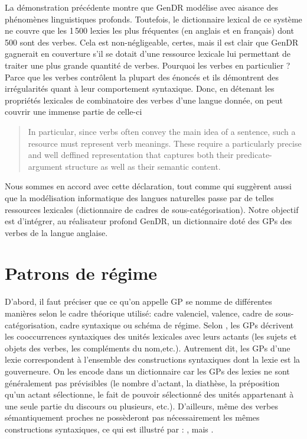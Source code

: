 
La démonstration précédente montre que GenDR modélise avec aisance des phénomènes linguistiques profonds. Toutefois, le dictionnaire lexical de ce système ne couvre que les 1\,500 lexies les plus fréquentes (en anglais et en français) dont 500 sont des verbes. Cela est non-négligeable, certes, mais il est clair que GenDR gagnerait en couverture s'il se dotait d'une ressource lexicale lui permettant de traiter une plus grande quantité de verbes. Pourquoi les verbes en particulier ? Parce que les verbes contrôlent la plupart des énoncés et ils démontrent des irrégularités quant à leur comportement syntaxique. Donc, en détenant les propriétés lexicales de combinatoire des verbes d'une langue donnée, on peut couvrir une immense partie de celle-ci

\begin{quote}
In particular, since verbs often convey the main idea of a sentence, such a resource must represent verb meanings. These require a particularly precise and well deffined representation that captures both their predicate-argument structure as well as their semantic content.
\end{quote}
\vspace{-\baselineskip}
\hfill
\cite{SchulerVerbnetBroadcoverageComprehensive2005}

Nous sommes en accord avec cette déclaration, tout comme \cite{Korhonenlargesubcategorizationlexicon2006} qui suggèrent aussi que la modélisation informatique des langues naturelles passe par de telles ressources lexicales (dictionnaire de cadres de sous-catégorisation).  Notre objectif est d'intégrer, au réalisateur profond GenDR, un dictionnaire doté des \acp{GP} des verbes de la langue anglaise.

\section{Patrons de régime}\label{sec:gp}

D'abord, il faut préciser que ce qu'on appelle \ac{GP} se nomme de différentes manières selon le cadre théorique utilisé: cadre valenciel, valence, cadre de sous-catégorisation, cadre syntaxique ou schéma de régime. Selon \cite{MilicevicSchemaregimepont2009}, les \acp{GP} décrivent les cooccurrences syntaxiques des unités lexicales avec leurs actants (les sujets et objets des verbes, les compléments du nom,etc.). Autrement dit, les \acp{GP} d'une lexie correspondent à l'ensemble des constructions syntaxiques dont la lexie est la gouverneure. On les encode dans un dictionnaire car les \acp{GP} des lexies ne sont généralement pas prévisibles (le nombre d'actant, la diathèse, la préposition qu'un actant sélectionne, le fait de pouvoir sélectionné des unités appartenant à une seule partie du discours ou plusieurs, etc.). D'ailleurs, même des verbes sémantiquement proches ne possèderont pas nécessairement les mêmes constructions syntaxiques, ce qui est illustré par \cite{MilicevicSchemaregimepont2009}: , mais .

